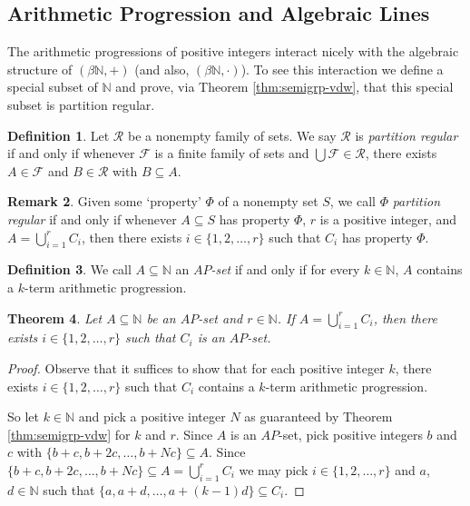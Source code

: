\documentclass[12pt,showtrims]{memoir}
\theoremstyle{plain}
\newtheorem{thm}{Theorem}[section]
\theoremstyle{definition}
\newtheorem{defn}[thm]{Definition}
\newtheorem{rmk}[thm]{Remark}
\newcommand{\bbN}{\mathbb{N}}
\newcommand{\calF}{\mathcal{F}}
\newcommand{\calR}{\mathcal{R}}
\begin{document}
\subsection{Arithmetic Progression and Algebraic Lines}
The arithmetic progressions of positive integers interact nicely with the algebraic structure of $(\beta \bbN, +)$ (and also, $(\beta \bbN, \cdot)$). 
To see this interaction we define a special subset of $\bbN$ and prove, via Theorem \ref{thm:semigrp-vdw}, that this special subset is partition regular.%

\begin{defn}
  Let $\calR$ be a nonempty family of sets.
  We say $\calR$ is \emph{partition regular} if and only if whenever $\calF$ is a finite family of sets and $\bigcup \calF \in \calR$, there exists $A \in \calF$ and $B \in \calR$ with $B \subseteq A$.
\end{defn}
\begin{rmk}
  Given some `property' $\Phi$ of a nonempty set $S$, we call $\Phi$ \emph{partition regular} if and only if whenever $A \subseteq S$ has property $\Phi$, $r$ is a positive integer, and $A = \bigcup_{i=1}^r C_i$, then there exists $i \in \{1, 2, \ldots, r\}$ such that $C_i$ has property $\Phi$.
\end{rmk}

\begin{defn}
  We call $A \subseteq \bbN$ an \emph{$AP$-set} if and only if for every $k \in \bbN$, $A$ contains a $k$-term arithmetic progression.
\end{defn}

\begin{thm}
  \label{thm:ap-partition-reg}
  Let $A \subseteq \bbN$ be an $AP$-set and $r \in \bbN$.
  If $A = \bigcup_{i=1}^r C_i$, then there exists $i \in \{1, 2, \ldots, r\}$ such that $C_i$ is an $AP$-set.
\end{thm}
\begin{proof}
  Observe that it suffices to show that for each positive integer $k$, there exists $i \in \{1, 2, \ldots, r\}$ such that $C_i$ contains a $k$-term arithmetic progression.

  So let $k \in \bbN$ and pick a positive integer $N$ as guaranteed by Theorem \ref{thm:semigrp-vdw} for $k$ and $r$.
  Since $A$ is an $AP$-set, pick positive integers $b$ and $c$ with $\{b+c, b+2c, \ldots, b+Nc\} \subseteq A$. 
  Since $\{b+c, b+2c, \ldots, b+Nc \} \subseteq A = \bigcup_{i=1}^r C_i$ we may pick $i \in \{1, 2, \ldots, r\}$ and $a$, $d \in \bbN$ such that $\{a, a+d, \ldots, a+(k-1)d\} \subseteq C_i$.
\end{proof}
\end{document}

